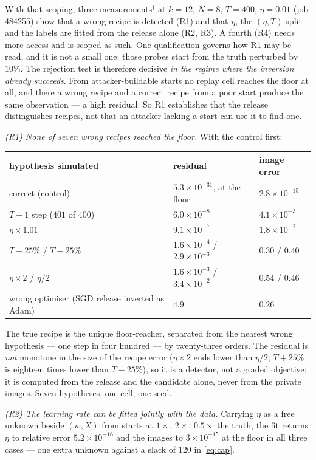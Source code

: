 With that scoping, three measurements$^\dagger$ at $k=12$, $N=8$, $T=400$,
$\eta=0.01$ (job 484255) show that a wrong recipe is detected (R1) and that
$\eta$, the $(\eta,T)$ split and the labels are fitted from the release alone
(R2, R3). A fourth (R4) needs more access and is scoped as such. One
qualification governs how R1 may be read, and it is not a small one: those
probes start from the truth perturbed by $10\%$. The rejection test is
therefore decisive \emph{in the regime where the inversion already succeeds}.
From attacker-buildable starts no replay cell reaches the floor at all, and
there a wrong recipe and a correct recipe from a poor start produce the same
observation --- a high residual. So R1 establishes that the release
distinguishes recipes, not that an attacker lacking a start can use it to find
one.

\emph{(R1) None of seven wrong recipes reached the floor.} With the control first:
\begin{center}\small
\begin{tabular}{@{}lll@{}}\toprule
hypothesis simulated & residual & image error\\ \midrule
correct (control) & $5.3\times10^{-31}$, at the floor & $2.8\times10^{-15}$\\
$T+1$ step ($401$ of $400$) & $6.0\times10^{-8}$ & $4.1\times10^{-3}$\\
$\eta\times1.01$ & $9.1\times10^{-7}$ & $1.8\times10^{-2}$\\
$T+25\%$ \;/\; $T-25\%$ & $1.6\times10^{-4}$ \;/\; $2.9\times10^{-3}$ & $0.30$ \;/\; $0.40$\\
$\eta\times2$ \;/\; $\eta/2$ & $1.6\times10^{-3}$ \;/\; $3.4\times10^{-2}$ & $0.54$ \;/\; $0.46$\\
wrong optimiser (SGD release inverted as Adam) & $4.9$ & $0.26$\\ \bottomrule
\end{tabular}
\end{center}
The true recipe is the unique floor-reacher, separated from the nearest
wrong hypothesis — one step in four hundred — by twenty-three orders. The
residual is \emph{not} monotone in the size of the recipe error
($\eta\times2$ ends lower than $\eta/2$; $T+25\%$ is eighteen times lower
than $T-25\%$), so it is a detector, not a graded objective; it is computed
from the release and the candidate alone, never from the private images.
Seven hypotheses, one cell, one seed.

\emph{(R2) The learning rate can be fitted jointly with the data.} Carrying
$\eta$ as a free unknown beside $(w,X)$ from starts at $1\times$, $2\times$,
$0.5\times$ the truth, the fit returns $\eta$ to relative error
$5.2\times10^{-16}$ and the images to $3\times10^{-15}$ at the floor in all
three cases — one extra unknown against a slack of $120$ in \eqref{eq:cap}.


